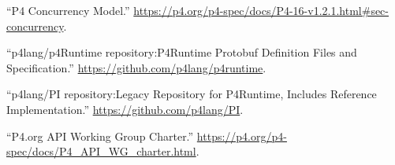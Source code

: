 \documentclass[11pt]{article}
\begin{document}
{{\begin{thebibliography}{40}
\mdbibitemlabel{{}[15]}\textquotedblleft{}P4 Concurrency Model.\textquotedblright{} \href{https://p4.org/p4-spec/docs/P4-16-v1.2.1.html\%23sec-concurrency}{{\ttfamily https://\hspace{0pt}p4.\hspace{0pt}org/\hspace{0pt}p4-\hspace{0pt}spec/\hspace{0pt}docs/\hspace{0pt}P4-\hspace{0pt}16-\hspace{0pt}v1.\hspace{0pt}2.\hspace{0pt}1.\hspace{0pt}html\#\hspace{0pt}sec-\hspace{0pt}concurrency}}.\label{p4concurrency}%

\mdbibitemlabel{{}[16]}\textquotedblleft{}p4lang/p4Runtime repository:P4Runtime Protobuf Definition Files and Specification.\textquotedblright{} \href{https://github.com/p4lang/p4runtime}{{\ttfamily https://\hspace{0pt}github.\hspace{0pt}com/\hspace{0pt}p4lang/\hspace{0pt}p4runtime}}.\label{p4runtimerepo}%

\mdbibitemlabel{{}[17]}\textquotedblleft{}p4lang/PI repository:Legacy Repository for P4Runtime, Includes Reference Implementation.\textquotedblright{} \href{https://github.com/p4lang/PI}{{\ttfamily https://\hspace{0pt}github.\hspace{0pt}com/\hspace{0pt}p4lang/\hspace{0pt}PI}}.\label{pirepo}%

\mdbibitemlabel{{}[18]}\textquotedblleft{}P4.org API Working Group Charter.\textquotedblright{} \href{https://p4.org/p4-spec/docs/P4_API_WG_charter.html}{{\ttfamily https://\hspace{0pt}p4.\hspace{0pt}org/\hspace{0pt}p4-\hspace{0pt}spec/\hspace{0pt}docs/\hspace{0pt}P4\_\hspace{0pt}API\_\hspace{0pt}WG\_\hspace{0pt}charter.\hspace{0pt}html}}.\label{p4apiwgcharter}%


\end{thebibliography}}}
\end{document}
